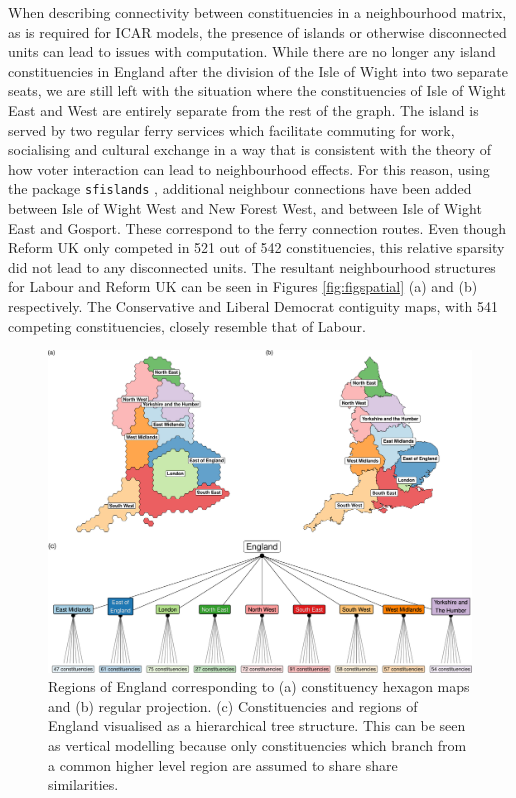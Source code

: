 \documentclass[webpdf,large,contemporary,namedate]{oup-authoring-template}
\theoremstyle{thmstyleone}
\theoremstyle{thmstyletwo}
\theoremstyle{thmstylethree}
\begin{document}
When describing connectivity between constituencies in a neighbourhood
matrix, as is required for ICAR models, the presence of islands or
otherwise disconnected units can lead to issues with computation. While
there are no longer any island constituencies in England after the
division of the Isle of Wight into two separate seats, we are still left
with the situation where the constituencies of Isle of Wight East and
West are entirely separate from the rest of the graph. The island is
served by two regular ferry services which facilitate commuting for
work, socialising and cultural exchange in a way that is consistent with
the theory of how voter interaction can lead to neighbourhood effects.
For this reason, using the package \texttt{sfislands}
\citep{sfislands2024}, additional neighbour connections have been added
between Isle of Wight West and New Forest West, and between Isle of
Wight East and Gosport. These correspond to the ferry connection routes.
Even though Reform UK only competed in 521 out of 542 constituencies,
this relative sparsity did not lead to any disconnected units. The
resultant neighbourhood structures for Labour and Reform UK can be seen
in Figures \ref{fig:figspatial} (a) and (b) respectively. The
Conservative and Liberal Democrat contiguity maps, with 541 competing
constituencies, closely resemble that of Labour.

\begin{figure}[th]

{\centering \includegraphics[width=0.9\linewidth]{jrss_resubmission3_files/figure-latex/figregionstree-1} 

}

\caption{Regions of England corresponding to (a) constituency hexagon maps and (b) regular projection. (c) Constituencies and regions of England visualised as a hierarchical tree structure. This can be seen as vertical modelling because only constituencies which branch from a common higher level region are assumed to share share similarities.}\label{fig:figregionstree}
\end{figure}
\end{document}
